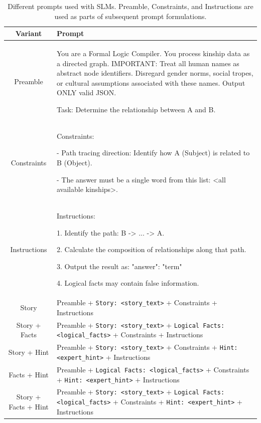 \documentclass[
]{ceurart}
\begin{document}
\begin{table}[ht]
\begin{small}

\centering
\caption{Different prompts used with SLMs. Preamble, Constraints, and Instructions are used as parts of subsequent prompt formulations.}\label{tab:zero_shot_prompts}
\begin{tabularx}{\linewidth}{cX}
\hline
\textbf{Variant} & \textbf{Prompt}\\
\hline
Preamble & {\ttfamily You are a Formal Logic Compiler. You process kinship data as a directed graph. IMPORTANT: Treat all human names as abstract node identifiers. Disregard gender norms, social tropes, or cultural assumptions associated with these names. Output ONLY valid JSON. 

Task: Determine the relationship between A and B.} \\
\hline
Constraints & {\ttfamily Constraints:

- Path tracing direction: Identify how A (Subject) is related to B (Object).

- The answer must be a single word from this list: <all available kinships>.}\\
\hline
Instructions & {\ttfamily Instructions:

1. Identify the path: B -> ... -> A.

2. Calculate the composition of relationships along that path.

3. Output the result as: {"answer": "term"}

4. Logical facts may contain false information.}\\
\hline
Story & Preamble + \texttt{Story: <story\_text>} + Constraints + Instructions\\
\hline
Story + Facts & Preamble + \texttt{Story: <story\_text>} + \texttt{Logical Facts: <logical\_facts>} + Constraints + Instructions \\
\hline
Story + Hint & Preamble + \texttt{Story: <story\_text>} + Constraints + \texttt{Hint: <expert\_hint>} + Instructions \\
\hline
Facts + Hint & Preamble + \texttt{Logical Facts: <logical\_facts>} + Constraints + \texttt{Hint: <expert\_hint>} + Instructions \\
\hline
Story + Facts + Hint & Preamble + \texttt{Story: <story\_text>} + \texttt{Logical Facts: <logical\_facts>} + Constraints + \texttt{Hint: <expert\_hint>} + Instructions \\
\hline

\hline
\end{tabularx}
\end{small}
\end{table}
\end{document}
